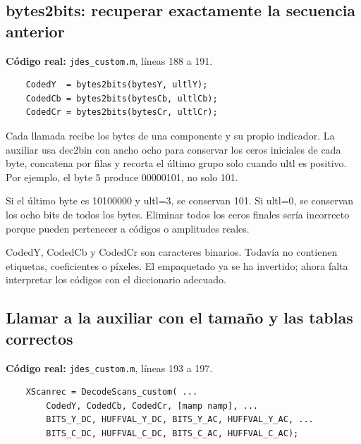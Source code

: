 \documentclass[11pt,a4paper,oneside]{report}
\begin{document}
\par\medskip\noindent\begin{minipage}{\linewidth}

\subsection{bytes2bits: recuperar exactamente la secuencia anterior}

\textbf{Código real:} \texttt{jdes\_custom.m}, líneas 188 a 191.

\begin{lstlisting}[firstnumber=188]
    % PASO 6: recuperar las secuencias binarias.
    CodedY  = bytes2bits(bytesY, ultlY);
    CodedCb = bytes2bits(bytesCb, ultlCb);
    CodedCr = bytes2bits(bytesCr, ultlCr);
\end{lstlisting}

\end{minipage}\par


Cada llamada recibe los bytes de una componente y su propio indicador.
La auxiliar usa dec2bin con ancho ocho para conservar los ceros iniciales
de cada byte, concatena por filas y recorta el último grupo solo cuando
ultl es positivo. Por ejemplo, el byte 5 produce 00000101, no solo 101.

Si el último byte es 10100000 y ultl=3, se conservan 101. Si ultl=0, se
conservan los ocho bits de todos los bytes. Eliminar todos los ceros finales
sería incorrecto porque pueden pertenecer a códigos o amplitudes reales.

CodedY, CodedCb y CodedCr son caracteres binarios. Todavía no contienen
etiquetas, coeficientes o píxeles. El empaquetado ya se ha invertido; ahora
falta interpretar los códigos con el diccionario adecuado.


\par\medskip\noindent\begin{minipage}{\linewidth}

\subsection{Llamar a la auxiliar con el tamaño y las tablas correctos}

\textbf{Código real:} \texttt{jdes\_custom.m}, líneas 193 a 197.

\begin{lstlisting}[firstnumber=193]
    % PASO 8: decodificar con las tablas Huffman a medida.
    XScanrec = DecodeScans_custom( ...
        CodedY, CodedCb, CodedCr, [mamp namp], ...
        BITS_Y_DC, HUFFVAL_Y_DC, BITS_Y_AC, HUFFVAL_Y_AC, ...
        BITS_C_DC, HUFFVAL_C_DC, BITS_C_AC, HUFFVAL_C_AC);
\end{lstlisting}

\end{minipage}\par
\end{document}
